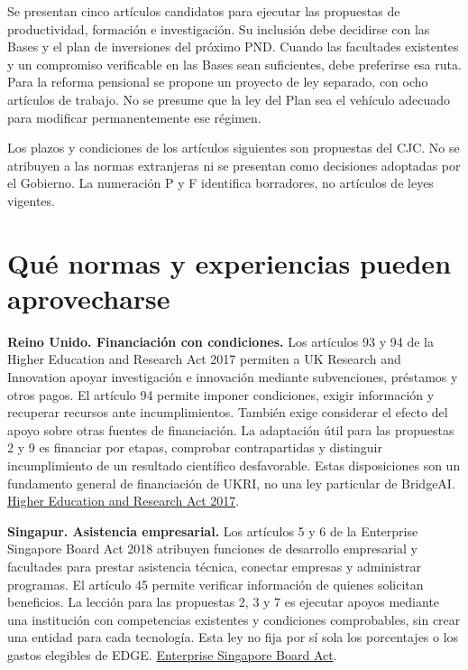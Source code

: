 Se presentan cinco artículos candidatos para ejecutar las propuestas de productividad, formación e investigación. Su inclusión debe decidirse con las Bases y el plan de inversiones del próximo PND. Cuando las facultades existentes y un compromiso verificable en las Bases sean suficientes, debe preferirse esa ruta. Para la reforma pensional se propone un proyecto de ley separado, con ocho artículos de trabajo. No se presume que la ley del Plan sea el vehículo adecuado para modificar permanentemente ese régimen.

Los plazos y condiciones de los artículos siguientes son propuestas del CJC. No se atribuyen a las normas extranjeras ni se presentan como decisiones adoptadas por el Gobierno. La numeración P y F identifica borradores, no artículos de leyes vigentes.

\section*{Qué normas y experiencias pueden aprovecharse}

\textbf{Reino Unido. Financiación con condiciones.} Los artículos 93 y 94 de la Higher Education and Research Act 2017 permiten a UK Research and Innovation apoyar investigación e innovación mediante subvenciones, préstamos y otros pagos. El artículo 94 permite imponer condiciones, exigir información y recuperar recursos ante incumplimientos. También exige considerar el efecto del apoyo sobre otras fuentes de financiación. La adaptación útil para las propuestas 2 y 9 es financiar por etapas, comprobar contrapartidas y distinguir incumplimiento de un resultado científico desfavorable. Estas disposiciones son un fundamento general de financiación de UKRI, no una ley particular de BridgeAI. \href{https://www.legislation.gov.uk/ukpga/2017/29/pdfs/ukpga\_20170029\_en.pdf}{Higher Education and Research Act 2017}.

\textbf{Singapur. Asistencia empresarial.} Los artículos 5 y 6 de la Enterprise Singapore Board Act 2018 atribuyen funciones de desarrollo empresarial y facultades para prestar asistencia técnica, conectar empresas y administrar programas. El artículo 45 permite verificar información de quienes solicitan beneficios. La lección para las propuestas 2, 3 y 7 es ejecutar apoyos mediante una institución con competencias existentes y condiciones comprobables, sin crear una entidad para cada tecnología. Esta ley no fija por sí sola los porcentajes o los gastos elegibles de EDGE. \href{https://sso.agc.gov.sg/Act/ESBA2018}{Enterprise Singapore Board Act}.

